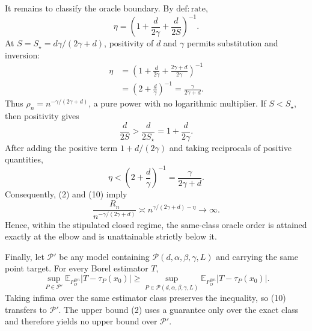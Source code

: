 It remains to classify the oracle boundary.  By \(\mathrm{def:rate}\),
\[
 \eta=\left(1+\frac d{2\gamma}+\frac d{2S}\right)^{-1}.
\]
At \(S=S_\star=d\gamma/(2\gamma+d)\), positivity of \(d\) and \(\gamma\) permits substitution and inversion:
\[
\begin{aligned}
 \eta
 &=\left(1+\frac d{2\gamma}
          +\frac{2\gamma+d}{2\gamma}\right)^{-1}\\
 &=\left(2+\frac d\gamma\right)^{-1}
 =\frac\gamma{2\gamma+d}.                                      \tag{11}
\end{aligned}
\]
Thus \(\rho_n=n^{-\gamma/(2\gamma+d)}\), a pure power with no logarithmic multiplier.  If \(S<S_\star\), then positivity gives
\[
 \frac d{2S}>\frac d{2S_\star}
 =1+\frac d{2\gamma}.
\]
After adding the positive term \(1+d/(2\gamma)\) and taking reciprocals of positive quantities,
\[
 \eta<\left(2+\frac d\gamma\right)^{-1}
 =\frac\gamma{2\gamma+d}.                                      \tag{12}
\]
Consequently, (2) and (10) imply
\[
 \frac{R_n}{n^{-\gamma/(2\gamma+d)}}
 \asymp n^{\gamma/(2\gamma+d)-\eta}\longrightarrow\infty.      \tag{13}
\]
Hence, within the stipulated closed regime, the same-class oracle order is attained exactly at the elbow and is unattainable strictly below it.

Finally, let \(\mathcal P'\) be any model containing \(\mathcal P(d,\alpha,\beta,\gamma,L)\) and carrying the same point target.  For every Borel estimator \(T\),
\[
 \sup_{P\in\mathcal P'}\mathbb E_{P_O^{\otimes n}}|T-\tau_P(x_0)|
 \ge
 \sup_{P\in\mathcal P(d,\alpha,\beta,\gamma,L)}
 \mathbb E_{P_O^{\otimes n}}|T-\tau_P(x_0)|.
\]
Taking infima over the same estimator class preserves the inequality, so (10) transfers to \(\mathcal P'\).  The upper bound (2) uses a guarantee only over the exact class and therefore yields no upper bound over \(\mathcal P'\).
